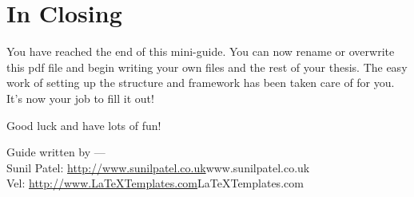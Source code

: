 
\section{In Closing}

You have reached the end of this mini-guide. You can now rename or overwrite this pdf file and begin writing your own  files and the rest of your thesis. The easy work of setting up the structure and framework has been taken care of for you. It's now your job to fill it out!

Good luck and have lots of fun!

\begin{flushright}
Guide written by ---\\
Sunil Patel: \url{http://www.sunilpatel.co.uk}{www.sunilpatel.co.uk}\\
Vel: \url{http://www.LaTeXTemplates.com}{LaTeXTemplates.com}
\end{flushright}
